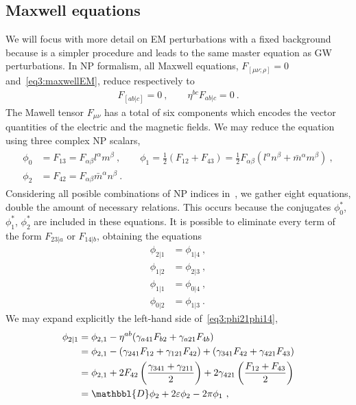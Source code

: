 \subsection{Maxwell equations}

We will focus with more detail on EM perturbations with a fixed background because is a simpler procedure and leads to the same master equation as GW perturbations. In NP formalism, all Maxwell equations, $F_{[\mu\nu ; \rho]}=0$ and~\eqref{eq3:maxwellEM}, reduce respectively to
\begin{align}
    F_{[ab \rvert c]} = 0 ~,\qquad \eta^{bc} F_{ab \rvert c} = 0 ~.
    \label{eq3:maxwellFabEqs}
\end{align}
The Mawell tensor $F_{\mu\nu}$ has a total of six components which encodes the vector quantities of the electric and the magnetic fields. We may reduce the equation using three complex NP scalars,
\begin{align}
    \begin{split}
        \phi_0 &= F_{13} = F_{\alpha\beta} l^\alpha m^\beta ~,\qquad
        \phi_1 = \tfrac{1}{2} (F_{12} + F_{43}) = \tfrac{1}{2} F_{\alpha\beta} (l^\alpha n^\beta + \bar{m}^\alpha m^\beta) ~,\\
        \phi_2 &= F_{42} = F_{\alpha\beta} \bar{m}^\alpha n^\beta ~.
    \end{split}
    \label{eq3:maxwellNPphi}
\end{align}
Considering all posible combinations of NP indices in~, we gather eight equations, double the amount of necessary relations. 
This occurs because the conjugates $\phi_0^*$, $\phi_1^*$, $\phi_2^*$ are included in these equations. It is possible to eliminate every term of the form $F_{23\rvert a}$ or $F_{14\rvert b}$, obtaining the equations
\begin{subequations}
    \begin{align}
        \phi_{2\rvert 1} &= \phi_{1\rvert 4} ~, \label{eq3:phi21phi14}\\
        \phi_{1\rvert 2} &= \phi_{2\rvert 3} ~, \label{eq3:phi12phi23}\\
        \phi_{1\rvert 1} &= \phi_{0\rvert 4} ~, \label{eq3:phi11phi04}\\
        \phi_{0\rvert 2} &= \phi_{1\rvert 3} ~. \label{eq3:phi02phi13}
    \end{align}
\end{subequations}
We may expand explicitly the left-hand side of~\eqref{eq3:phi21phi14},
\begin{align}
    \begin{split}
        \phi_{2\rvert 1} &= \phi_{2, 1} - \eta^{ab}( \gamma_{a41} F_{b2} + \gamma_{a21} F_{4b} ) \\
        &= \phi_{2, 1} - (\gamma_{241} F_{12} + \gamma_{121} F_{42}) + ( \gamma_{341} F_{42} + \gamma_{421} F_{43} ) \\
        &= \phi_{2, 1} + 2 F_{42} \left(\frac{\gamma_{341} + \gamma_{211}}{2}\right) + 2 \gamma_{421} \left(\frac{F_{12} + F_{43}}{2}\right) \\
        &= \mathbbl{D} \phi_2 + 2 \varepsilon \phi_2 - 2 \pi \phi_1 ~,
    \end{split}
    \label{eq3:phi21SpinCoef}
\end{align}
